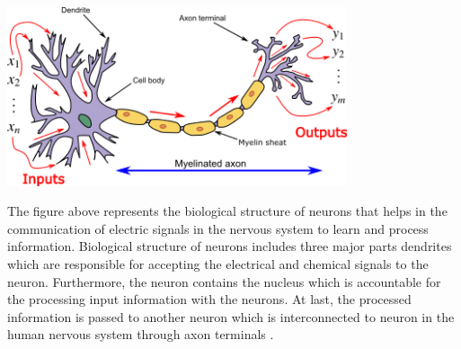 \vspace{3mm}
\begin{center}
\includegraphics[width=10cm]{Images/neuron.png}
\end{center}

The figure above represents the biological structure of neurons that helps in the communication of electric signals in the 
nervous system to learn and process information. Biological structure of neurons
includes three major parts dendrites which are responsible for accepting the electrical and chemical signals to the neuron. 
Furthermore, the neuron contains the nucleus which is accountable for the processing input information with the neurons. 
At last, the processed information is passed to another neuron which is interconnected to 
neuron in the human nervous system through axon terminals
\citep*{AGATONOVICKUSTRIN2000717}. 
